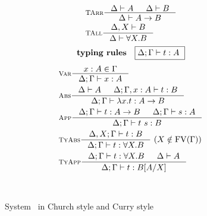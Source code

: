\begin{figure}
\begin{singlespace}
\begin{minipage}{.46\textwidth}
\begin{align*}
& \inference[\sc TArr]{\Delta |- A & \Delta |- B}{\Delta |- A -> B} \\
& \inference[\sc TAll]{\Delta,X |- B}{\Delta |- \forall X.B} \\
\end{align*}
\[ \textbf{typing rules} \quad \framebox{$ \Delta;\Gamma |- t : A $ } \]
\vspace*{-1em}
\begin{align*}
& \inference[\sc Var]{x:A \in \Gamma}{\Delta;\Gamma |- x:A} \\
& \inference[\sc Abs]{\Delta |- A & \Delta;\Gamma,x:A |- t : B}
                     {\Delta;\Gamma |- \l x   .t : A -> B} \\
& \inference[\sc App]{\Delta;\Gamma |- t : A -> B & \Delta;\Gamma |- s : A}
                     {\Delta;\Gamma |- t~s : B} \\
& \inference[\sc TyAbs]{\Delta,X;\Gamma |- t : B}
                       {\Delta;\Gamma |- t : \forall X.B} ~
                       (X\notin\FV(\Gamma)) \\
& \inference[\sc TyApp]{\Delta;\Gamma |- t : \forall X.B & \Delta |- A}
                       {\Delta;\Gamma |- t : B[A/X]}
\end{align*}
\end{minipage}
~\\
\caption{System \F\ in Church style and Curry style}
\label{fig:f}
\end{singlespace}
\end{figure}

